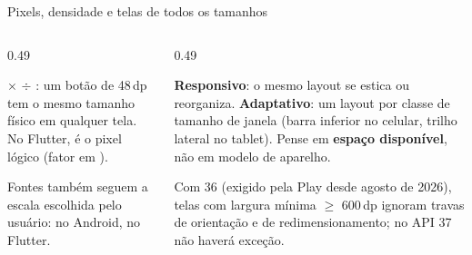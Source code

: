 \begin{frame}{Pixels, densidade e telas de todos os tamanhos}
  \begin{columns}[T]
    \begin{column}{0.49\textwidth}
      \centering
      \raggedright
      \begin{definicao}
         $\times$  $\div$ : um botão de 48\,dp tem o mesmo tamanho físico em qualquer tela. No Flutter, é o pixel lógico (fator em ).
      \end{definicao}
      \begin{dica}[Texto]
        Fontes também seguem a escala escolhida pelo usuário:  no Android,  no Flutter.
      \end{dica}
    \end{column}
    \begin{column}{0.49\textwidth}
      \begin{conceito}
        \textbf{Responsivo}: o mesmo layout se estica ou reorganiza. \textbf{Adaptativo}: um layout por classe de tamanho de janela (barra inferior no celular, trilho lateral no tablet). Pense em \textbf{espaço disponível}, não em modelo de aparelho.
      \end{conceito}
      \begin{atencao}
        Com  36 (exigido pela Play desde agosto de 2026), telas com largura mínima $\geq$ 600\,dp ignoram travas de orientação e de redimensionamento; no API 37 não haverá exceção.
      \end{atencao}
    \end{column}
  \end{columns}
\end{frame}
